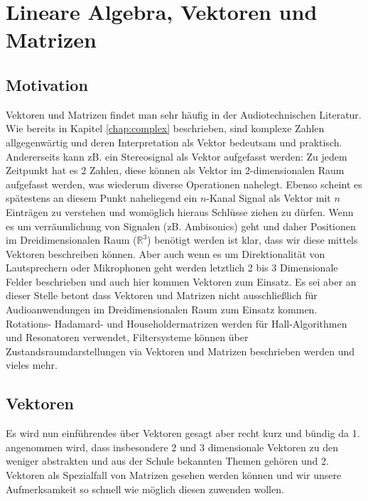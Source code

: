\chapter{Lineare Algebra, Vektoren und Matrizen}

\section{Motivation}
Vektoren und Matrizen findet man sehr häufig in der Audiotechnischen Literatur. Wie bereits in Kapitel \ref{chap:complex} beschrieben, sind komplexe Zahlen allgegenwärtig und deren Interpretation als Vektor bedeutsam und praktisch. Andererseits kann zB. ein Stereosignal als Vektor aufgefasst werden: Zu jedem Zeitpunkt hat es 2 Zahlen, diese können als Vektor im 2-dimensionalen Raum aufgefasst werden, was wiederum diverse Operationen nahelegt. Ebenso scheint es spätestens an diesem Punkt naheliegend ein $n$-Kanal Signal als Vektor mit $n$ Einträgen zu verstehen und womöglich hieraus Schlüsse ziehen zu dürfen. Wenn es um verräumlichung von Signalen (zB. Ambisonics) geht und daher Positionen im Dreidimensionalen Raum ($\mathbb{R}^3$) benötigt werden ist klar, dass wir diese mittels Vektoren beschreiben können. Aber auch wenn es um Direktionalität von Lautsprechern oder Mikrophonen geht werden letztlich 2 bis 3 Dimensionale Felder beschrieben und auch hier kommen Vektoren zum Einsatz. Es sei aber an dieser Stelle betont dass Vektoren und Matrizen nicht ausschließlich für Audioanwendungen im Dreidimensionalen Raum zum Einsatz kommen. Rotations- Hadamard- und Householdermatrizen werden für Hall-Algorithmen und Resonatoren verwendet, Filtersysteme können über Zustandsraumdarstellungen via Vektoren und Matrizen beschrieben werden und vieles mehr.       

\section{Vektoren}
Es wird nun einführendes über Vektoren gesagt aber recht kurz und bündig da 1. angenommen wird, dass insbesondere 2 und 3 dimensionale Vektoren zu den weniger abstrakten und aus der Schule bekannten Themen gehören und 2. Vektoren als Spezialfall von Matrizen gesehen werden können und wir unsere Aufmerksamkeit so schnell wie möglich diesen zuwenden wollen.

